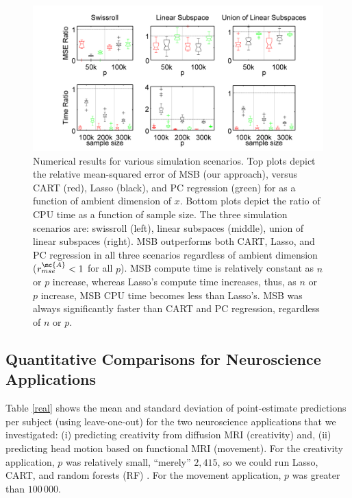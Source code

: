 \begin{figure}[h!]
\centering
 \vskip -0pt 
\includegraphics[width=1.0\linewidth]{../figs/boxplots.png}
 \vskip -10pt 
\caption{
Numerical results for various simulation scenarios.  Top plots depict the relative mean-squared error of MSB (our approach), versus CART (red), Lasso (black), and PC regression (green) for as a function of ambient dimension of $x$.  
Bottom plots depict the ratio of CPU time as a function of sample size.
The three simulation scenarios are: 
swissroll (left),
linear subspaces (middle), 
union of linear subspaces (right). 
MSB outperforms both CART, Lasso, and PC regression in all three scenarios regardless of ambient dimension ($r_{mse}^{\mc{A}}< 1$ for all $p$).  MSB compute time is relatively constant as $n$ or $p$ increase, whereas Lasso's compute time increases, thus, as $n$ or $p$ increase, MSB CPU time becomes less than Lasso's.  MSB was always significantly faster than CART and PC regression, regardless of $n$ or $p$. } 

\label{fig:boxplots}
\end{figure}

 



\subsection{Quantitative Comparisons for Neuroscience Applications} \label{sub:real}



Table \ref{real} shows the mean and standard deviation of point-estimate predictions per subject (using leave-one-out) for the two neuroscience applications that we investigated: (i) predicting creativity from diffusion MRI (creativity) and, (ii) predicting head motion based on functional MRI (movement).  For the creativity application, $p$ was relatively small, ``merely'' $2,415$, so we could run Lasso, CART, and random forests (RF) \cite{Brieman2001}.  For the movement application, $p$ was greater than $100\,000$. 

